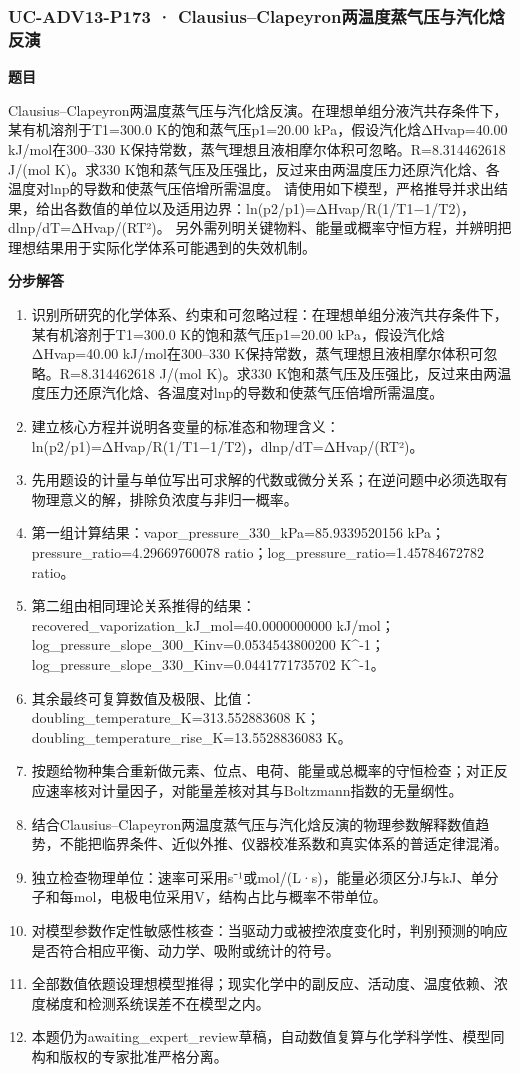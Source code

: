 \documentclass[UTF8,11pt,a4paper]{ctexart}
\begin{document}
\subsubsection*{UC-ADV13-P173 · Clausius–Clapeyron两温度蒸气压与汽化焓反演}
\noindent\textbf{题目}\par
Clausius–Clapeyron两温度蒸气压与汽化焓反演。在理想单组分液汽共存条件下，某有机溶剂于T1=300.0 K的饱和蒸气压p1=20.00 kPa，假设汽化焓ΔHvap=40.00 kJ/mol在300–330 K保持常数，蒸气理想且液相摩尔体积可忽略。R=8.314462618 J/(mol K)。求330 K饱和蒸气压及压强比，反过来由两温度压力还原汽化焓、各温度对lnp的导数和使蒸气压倍增所需温度。 请使用如下模型，严格推导并求出结果，给出各数值的单位以及适用边界：ln(p2/p1)=ΔHvap/R(1/T1−1/T2)，dlnp/dT=ΔHvap/(RT²)。 另外需列明关键物料、能量或概率守恒方程，并辨明把理想结果用于实际化学体系可能遇到的失效机制。\par
\medskip\noindent\textbf{分步解答}
\begin{enumerate}
\item 识别所研究的化学体系、约束和可忽略过程：在理想单组分液汽共存条件下，某有机溶剂于T1=300.0 K的饱和蒸气压p1=20.00 kPa，假设汽化焓ΔHvap=40.00 kJ/mol在300–330 K保持常数，蒸气理想且液相摩尔体积可忽略。R=8.314462618 J/(mol K)。求330 K饱和蒸气压及压强比，反过来由两温度压力还原汽化焓、各温度对lnp的导数和使蒸气压倍增所需温度。
\item 建立核心方程并说明各变量的标准态和物理含义：ln(p2/p1)=ΔHvap/R(1/T1−1/T2)，dlnp/dT=ΔHvap/(RT²)。
\item 先用题设的计量与单位写出可求解的代数或微分关系；在逆问题中必须选取有物理意义的解，排除负浓度与非归一概率。
\item 第一组计算结果：vapor\_pressure\_330\_kPa=85.9339520156 kPa；pressure\_ratio=4.29669760078 ratio；log\_pressure\_ratio=1.45784672782 ratio。
\item 第二组由相同理论关系推得的结果：recovered\_vaporization\_kJ\_mol=40.0000000000 kJ/mol；log\_pressure\_slope\_300\_Kinv=0.0534543800200 K\textasciicircum{}-1；log\_pressure\_slope\_330\_Kinv=0.0441771735702 K\textasciicircum{}-1。
\item 其余最终可复算数值及极限、比值：doubling\_temperature\_K=313.552883608 K；doubling\_temperature\_rise\_K=13.5528836083 K。
\item 按题给物种集合重新做元素、位点、电荷、能量或总概率的守恒检查；对正反应速率核对计量因子，对能量差核对其与Boltzmann指数的无量纲性。
\item 结合Clausius–Clapeyron两温度蒸气压与汽化焓反演的物理参数解释数值趋势，不能把临界条件、近似外推、仪器校准系数和真实体系的普适定律混淆。
\item 独立检查物理单位：速率可采用s⁻¹或mol/(L·s)，能量必须区分J与kJ、单分子和每mol，电极电位采用V，结构占比与概率不带单位。
\item 对模型参数作定性敏感性核查：当驱动力或被控浓度变化时，判别预测的响应是否符合相应平衡、动力学、吸附或统计的符号。
\item 全部数值依题设理想模型推得；现实化学中的副反应、活动度、温度依赖、浓度梯度和检测系统误差不在模型之内。
\item 本题仍为awaiting\_expert\_review草稿，自动数值复算与化学科学性、模型同构和版权的专家批准严格分离。
\end{enumerate}
\end{document}
